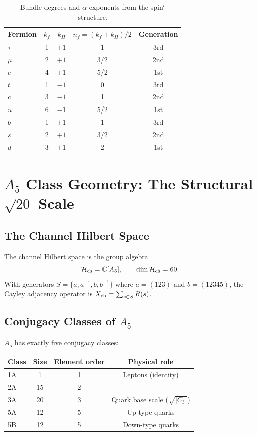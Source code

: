 \documentclass[11pt,a4paper]{article}
\theoremstyle{definition}
\theoremstyle{remark}
\begin{document}
\begin{table}[h]
\centering
\begin{tabular}{lcccc}
\toprule
Fermion & $k_f$ & $k_H$ & $n_f = (k_f+k_H)/2$ & Generation \\
\midrule
$\tau$ & 1 & $+1$ & 1 & 3rd \\
$\mu$  & 2 & $+1$ & 3/2 & 2nd \\
$e$    & 4 & $+1$ & 5/2 & 1st \\
$t$    & 1 & $-1$ & 0 & 3rd \\
$c$    & 3 & $-1$ & 1 & 2nd \\
$u$    & 6 & $-1$ & 5/2 & 1st \\
$b$    & 1 & $+1$ & 1 & 3rd \\
$s$    & 2 & $+1$ & 3/2 & 2nd \\
$d$    & 3 & $+1$ & 2 & 1st \\
\bottomrule
\end{tabular}
\caption{Bundle degrees and $\alpha$-exponents from the spin$^c$ structure.}
\label{tab:exponents}
\end{table}

\section{$A_5$ Class Geometry: The Structural $\sqrt{20}$ Scale}
\label{sec:sqrt20}

\subsection{The Channel Hilbert Space}

The channel Hilbert space is the group algebra
\begin{equation}
\mathcal{H}_{\rm ch} = \mathbb{C}[A_5], \qquad
\dim\mathcal{H}_{\rm ch} = 60.
\end{equation}
With generators $S = \{a, a^{-1}, b, b^{-1}\}$ where $a = (123)$ and
$b = (12345)$, the Cayley adjacency operator is
$X_{\rm ch} = \sum_{s\in S} R(s)$.

\subsection{Conjugacy Classes of $A_5$}

$A_5$ has exactly five conjugacy classes:

\begin{center}
\begin{tabular}{lccc}
\toprule
Class & Size & Element order & Physical role \\
\midrule
1A & 1 & 1 & Leptons (identity) \\
2A & 15 & 2 & --- \\
3A & 20 & 3 & Quark base scale ($\sqrt{|C_3|}$) \\
5A & 12 & 5 & Up-type quarks \\
5B & 12 & 5 & Down-type quarks \\
\bottomrule
\end{tabular}
\end{center}
\end{document}
